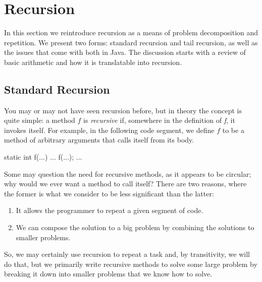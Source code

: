 \section{Recursion}

In this section we reintroduce recursion as a means of problem decomposition and repetition. We present two forms: standard recursion and tail recursion, as well as the issues that come with both in Java. The discussion starts with a review of basic arithmetic and how it is translatable into recursion.

\subsection{Standard Recursion}
You may or may not have seen recursion before, but in theory the concept is quite simple: a method $f$ is \emph{recursive} if, somewhere in the definition of \emph{f}, it invokes itself. For example, in the following code segment, we define $f$ to be a method of arbitrary arguments that calls itself from its body. 
\begin{verbnobox}[\small]
static int f(...) {
  ...
  f(...);
  ...
}
\end{verbnobox}
Some may question the need for recursive methods, as it appears to be circular; why would we ever want a method to call itself? There are two reasons, where the former is what we consider to be less significant than the latter:

\begin{enumerate}
    \item It allows the programmer to repeat a given segment of code.
    \item We can compose the solution to a big problem by combining the solutions to smaller problems.
\end{enumerate}
So, we may certainly use recursion to repeat a task and, by transitivity, we will do that, but we primarily write recursive methods to solve some large problem by breaking it down into smaller problems that we know how to solve.

